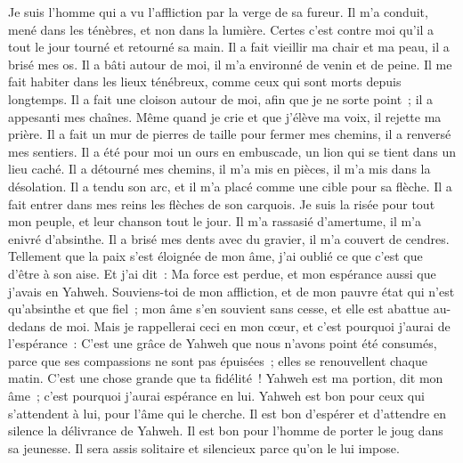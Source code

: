 \begin{multicols}{2}
\VerseOne{} Je suis l'homme qui a vu l'affliction par la verge de sa fureur.
Il m'a conduit, mené dans les ténèbres, et non dans la lumière.
Certes c'est contre moi qu'il a tout le jour tourné et retourné sa main.
 Il a fait vieillir ma chair et ma peau, il a brisé mes os.
Il a bâti autour de moi, il m'a environné de venin et de peine.
Il me fait habiter dans les lieux ténébreux, comme ceux qui sont morts depuis longtemps.
 Il a fait une cloison autour de moi, afin que je ne sorte point~; il a appesanti mes chaînes.
Même quand je crie et que j'élève ma voix, il rejette ma prière.
Il a fait un mur de pierres de taille pour fermer mes chemins, il a renversé mes sentiers.
 Il a été pour moi un ours en embuscade, un lion qui se tient dans un lieu caché.
Il a détourné mes chemins, il m'a mis en pièces, il m'a mis dans la désolation.
Il a tendu son arc, et il m'a placé comme une cible pour sa flèche.
 Il a fait entrer dans mes reins les flèches de son carquois.
Je suis la risée pour tout mon peuple, et leur chanson tout le jour.
Il m'a rassasié d'amertume, il m'a enivré d'absinthe.
 Il a brisé mes dents avec du gravier, il m'a couvert de cendres.
Tellement que la paix s'est éloignée de mon âme, j'ai oublié ce que c'est que d'être à son aise.
Et j'ai dit~: Ma force est perdue, et mon espérance aussi que j'avais en Yahweh.
 Souviens-toi de mon affliction, et de mon pauvre état qui n'est qu'absinthe et que fiel~;
mon âme s'en souvient sans cesse, et elle est abattue au-dedans de moi.
Mais je rappellerai ceci en mon cœur, et c'est pourquoi j'aurai de l'espérance~:
 C'est une grâce de Yahweh que nous n'avons point été consumés, parce que ses compassions ne sont pas épuisées~;
elles se renouvellent chaque matin. C'est une chose grande que ta fidélité~!
Yahweh est ma portion, dit mon âme~; c'est pourquoi j'aurai espérance en lui.
 Yahweh est bon pour ceux qui s'attendent à lui, pour l'âme qui le cherche.
Il est bon d'espérer et d'attendre en silence la délivrance de Yahweh.
Il est bon pour l'homme de porter le joug dans sa jeunesse.
 Il sera assis solitaire et silencieux parce qu'on le lui impose.

\end{multicols}
